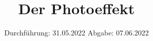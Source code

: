 

\subject{VERSUCH 500}
\title{Der Photoeffekt}
\date{%
  Durchführung: 31.05.2022
  \hspace{3em}
  Abgabe: 07.06.2022
}



\maketitle
\thispagestyle{empty}
\tableofcontents
\newpage







\printbibliography{}


